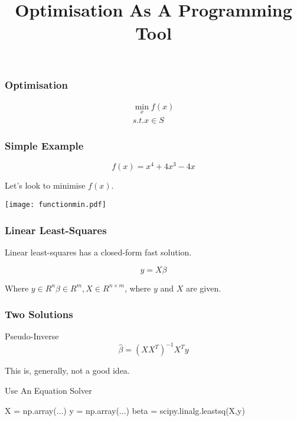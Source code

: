 
\title{Optimisation As A Programming Tool}

\frame{\maketitle}

\begin{frame}[fragile]
\frametitle{Optimisation}

\begin{align*}
\min_x f(x)\\
s.t. x \in S
\end{align*}

\end{frame}

\begin{frame}[fragile]
\frametitle{Simple Example}

\[
f(x) = x^4+4x^3-4x
\]

Let's look to minimise $f(x)$.

\end{frame}

\begin{frame}[fragile]

\centering
\texttt{[image: functionmin.pdf]}

\end{frame}

\begin{frame}[fragile]
\frametitle{Linear Least-Squares}

Linear least-squares has a closed-form \alert{fast} solution.

\[
y = X \beta
\]

Where $y \in R^{n} \beta \in R^m, X \in R^{n \times m}$, where $y$ and $X$ are given.

\end{frame}

\begin{frame}[fragile]
\frametitle{Two Solutions}

\begin{block}{Pseudo-Inverse}
\[
\hat{\beta} = (X X^T)^{-1}X^T y
\]
\end{block}

\pause
This is, generally, not a good idea.
\pause
\begin{block}{Use An Equation Solver}
\begin{python}
X = np.array(...)
y = np.array(...)
beta = scipy.linalg.leastsq(X,y)
\end{python}
\end{block}
\end{frame}

